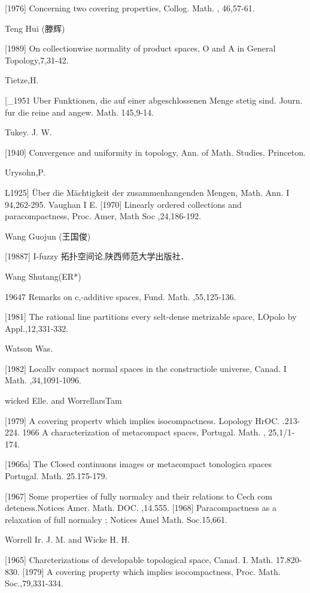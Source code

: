 \documentclass[main.tex]{subfiles}
\begin{document}
[1976]
Concerning two covering properties, Collog. Math. , 46,57-61.

\noindent Teng Hui (滕辉)

[1989]
On collectionwise normality of product spaces, O and A in General
Topology,7,31-42.

Tietze,H.

[_1951 Uber Funktionen, die auf einer abgeschlossenen Menge stetig sind.
Journ. fur die reine and angew. Math. 145,9-14.

Tukey. J. W.

[1940]
Convergence and uniformity in topology, Ann. of Math. Studies.
Princeton.

\noindent Urysohn,P.

L1925] Über die Mächtigkeit der zusammenhangenden Mengen, Math. Ann. I
94,262-295.
Vaughan I E.
[1970] Linearly ordered collections and paracompactness, Proc. Amer, Math
Soc
,24,186-192.

\noindent Wang Guojun (王国俊)

[19887] I-fuzzy 拓扑空间论,陕西师范大学出版社．

\noindent Wang Shutang(ER*)

	19647 Remarks on c,-additive spaces, Fund. Math. ,55,125-136.
	
	[1981]
	The rational line partitions every selt-dense metrizable space, LOpolo
	by
	Appl.,12,331-332.

\noindent Watson Was.
	
	[1982]
	Locallv compact normal spaces in the constructiole universe, Canad.
	I Math.
	,34,1091-1096.

\noindent 	wicked Elle. and WorrellarsTam

	[1979]
	A covering propertv which implies isocompactness. Lopology HrOC.
	.213-224.
	1966 A characterization of metacompact spaces, Portugal. Math. , 25,1/1-
	174.

	[1966a]
	The Closed
	continuons images or metacompact
	tonologica spaces
	Portugal.
	Math. 25.175-179.

	[1967]
	Some properties of fully normalcy and their relations to Cech com
	deteness.Notices Amer. Math.
	DOC. ,14.555.
	[1968]
	Paracompactness as a relaxation of full normalcy
	; Notices Amel
	Math. Soc.15,661.

\noindent Worrell Ir. J. M. and Wicke H. H.

	[1965]
	Charcterizations of developable topological space, Canad.
	I. Math.
	17.820-830.
	[1979]
	A covering property which implies isocompactness, Proc.
	Math. Soc.,79,331-334.
\end{document}
